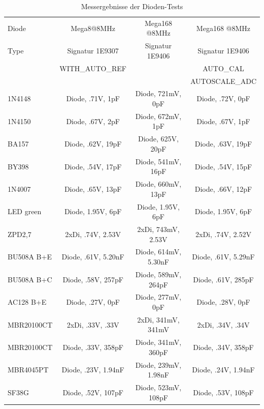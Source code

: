\begin{table}[H]
  \begin{center}
    \begin{tabular}{| l | c | c | c |}
    \hline
     Diode & Mega8@8MHz          & Mega168 @8MHz       & Mega168 @8MHz     \\
     Type  & Signatur 1E9307     & Signatur 1E9406     & Signatur 1E9406   \\
           & WITH\_AUTO\_REF     &                     & AUTO\_CAL         \\
           &                     &                     & AUTOSCALE\_ADC    \\
    \hline
    \hline
1N4148     & Diode, .71V, 1pF    & Diode, 721mV, 0pF   & Diode, .72V, 0pF  \\
    \hline
1N4150     & Diode, .67V, 2pF    & Diode, 672mV, 1pF   & Diode, .67V, 1pF  \\
    \hline
BA157      & Diode, .62V, 19pF   & Diode, 625V, 20pF   & Diode, .63V, 19pF \\
    \hline
BY398      & Diode, .54V, 17pF   & Diode, 541mV, 16pF  & Diode, .54V, 15pF \\
    \hline
1N4007     & Diode, .65V, 13pF   & Diode, 660mV, 13pF  & Diode, .66V, 12pF \\
    \hline
LED green  & Diode, 1.95V, 6pF   & Diode, 1.95V, 6pF   & Diode, 1.95V, 6pF \\
    \hline
ZPD2,7     & 2xDi, .74V, 2.53V   & 2xDi, 743mV, 2.53V  & 2xDi, .74V, 2.52V \\
    \hline
BU508A B+E & Diode, .61V, 5.20nF & Diode, 614mV, 5.30nF & Diode, .61V, 5.29nF\\
    \hline
BU508A B+C & Diode, .58V, 257pF  & Diode, 589mV, 264pF & Diode, .61V, 285pF\\
    \hline
AC128 B+E  & Diode, .27V, 0pF    & Diode, 277mV, 0pF   & Diode, .28V, 0pF  \\
    \hline
MBR20100CT & 2xDi, .33V, .33V    & 2xDi, 341mV, 341mV  & 2xDi, .34V, .34V  \\
    \hline
MBR20100CT & Diode, .33V, 358pF  & Diode, 341mV, 360pF & Diode, .34V, 358pF\\
    \hline
MBR4045PT  & Diode, .23V, 1.94nF & Diode, 239mV, 1.98nF & Diode, .24V, 1.94nF\\
    \hline
SF38G      & Diode, .52V, 107pF  & Diode, 523mV, 108pF & Diode, .53V, 108pF\\
    \hline
    \end{tabular}
  \end{center}
  \caption{Messergebnisse der Dioden-Tests}
  \label{tab:diodes} 
\end{table}

